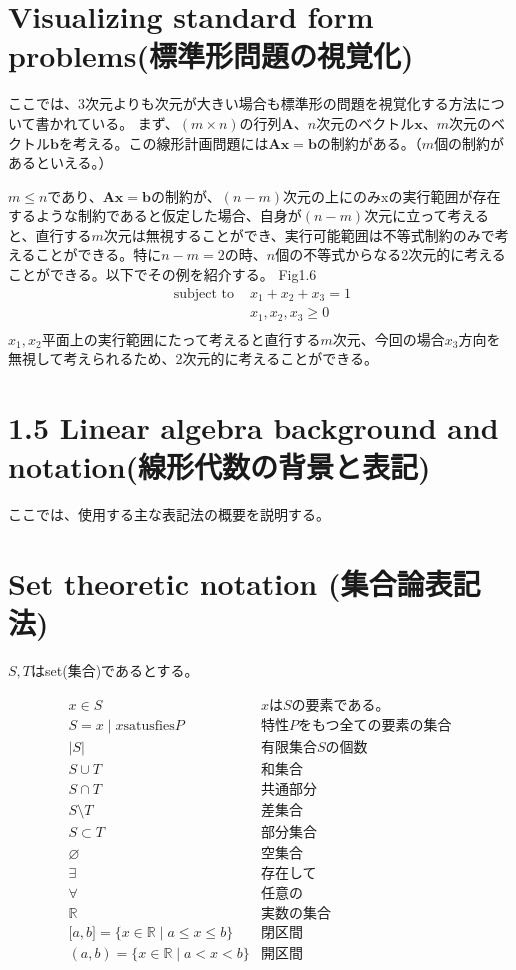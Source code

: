 \documentclass{jsarticle}
\begin{document}
\section*{Visualizing standard form problems(標準形問題の視覚化)}
ここでは、3次元よりも次元が大きい場合も標準形の問題を視覚化する方法について書かれている。
まず、$(m \times n)$の行列$\bm{A}$、$n$次元のベクトル$\bm{x}$、$m$次元のベクトル$\bm{b}$を考える。この線形計画問題には$\bm{A}\bm{x}=\bm{b}$の制約がある。（$m$個の制約があるといえる。）

$m \leq n$であり、$\bm{A}\bm{x}=\bm{b}$の制約が、$(n-m)$次元の上にのみxの実行範囲が存在するような制約であると仮定した場合、自身が$(n-m)$次元に立って考えると、直行する$m$次元は無視することができ、実行可能範囲は不等式制約のみで考えることができる。特に$n-m=2$の時、$n$個の不等式からなる2次元的に考えることができる。以下でその例を紹介する。
Fig1.6
\begin{equation}
\begin{array}{cc}
\text { subject to } & x_1+x_2+x_3=1 \\
& x_1,x_2,x_3 \geq 0\\
\end{array}
\end{equation}
$x_1,x_2$平面上の実行範囲にたって考えると直行する$m$次元、今回の場合$x_3$方向を無視して考えられるため、2次元的に考えることができる。

\section*{1.5 Linear algebra background and notation(線形代数の背景と表記)}
ここでは、使用する主な表記法の概要を説明する。
\section*{Set theoretic notation (集合論表記法)}
$S,T$はset(集合)であるとする。

\begin{equation*}
\begin{array}{cc}
x \in S&x\text{は}S\text{の要素である。}\\
S={x \mid x \text{satusfies} P}&\text{特性}P\text{をもつ全ての要素の集合}\\
|S|&\text{有限集合}S\text{の個数}\\
S\cup T&\text{和集合}\\
S\cap T&\text{共通部分}\\
S\setminus T&\text{差集合}\\
S\subset T&\text{部分集合}\\
\varnothing&\text{空集合}\\
\exists&\text{存在して}\\
\forall&\text{任意の}\\
\mathbb{R}&\text{実数の集合}\\
\text{[}a,b\text{]}=\{x\in \mathbb{R}\mid a\leq x\leq b\}&閉区間\\
(a,b)=\{x\in \mathbb{R}\mid a< x< b\}&開区間\\
\end{array}
\end{equation*}
\end{document}
